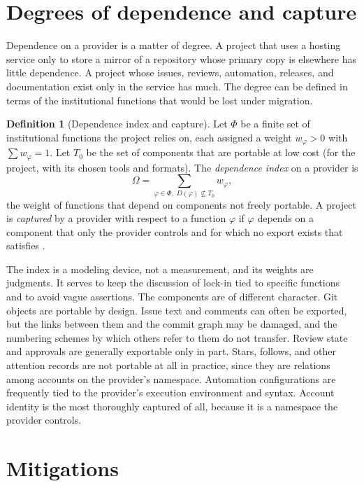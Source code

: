 \documentclass[11pt,twoside,openright]{book}
\theoremstyle{plain}
\theoremstyle{definition}
\newtheorem{definition}[theorem]{Definition}
\theoremstyle{remark}
\begin{document}
\section{Degrees of dependence and capture}

Dependence on a provider is a matter of degree. A project that uses a hosting service only to store a mirror of a repository whose primary copy is elsewhere has little dependence. A project whose issues, reviews, automation, releases, and documentation exist only in the service has much. The degree can be defined in terms of the institutional functions that would be lost under migration.

\begin{definition}[Dependence index and capture]\label{def:capture}
Let $\Phi$ be a finite set of institutional functions the project relies on, each assigned a weight $w_\varphi>0$ with $\sum w_\varphi=1$. Let $T_0$ be the set of components that are portable at low cost (for the project, with its chosen tools and formats). The \emph{dependence index} on a provider is
\[
\Omega=\sum_{\varphi\in\Phi,\;D(\varphi)\not\subseteq T_0}w_\varphi,
\]
the weight of functions that depend on components not freely portable. A project is \emph{captured} by a provider with respect to a function $\varphi$ if $\varphi$ depends on a component that only the provider controls and for which no export exists that satisfies .
\end{definition}

The index is a modeling device, not a measurement, and its weights are judgments. It serves to keep the discussion of lock-in tied to specific functions and to avoid vague assertions. The components are of different character. Git objects are portable by design. Issue text and comments can often be exported, but the links between them and the commit graph may be damaged, and the numbering schemes by which others refer to them do not transfer. Review state and approvals are generally exportable only in part. Stars, follows, and other attention records are not portable at all in practice, since they are relations among accounts on the provider's namespace. Automation configurations are frequently tied to the provider's execution environment and syntax. Account identity is the most thoroughly captured of all, because it is a namespace the provider controls.

\section{Mitigations}
\end{document}
